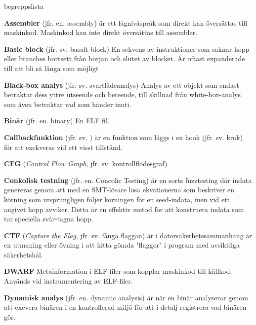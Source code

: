 \begin{labeling}{begreppslista}

    \item [\textbf{Assembler}] (jfr. en. assembly) är ett lågnivåspråk som
    direkt kan översättas till maskinkod. Maskinkod kan inte direkt översättas
    till assembler.

    \item[\textbf{Basic block}] (jfr. sv. basalt block) En sekvens av
    instruktioner som saknar hopp eller branches bortsett från början och slutet
    av blocket. Är oftast expanderade till att bli så långa som möjligt

    \item [\textbf{Black-box analys}] (jfr. sv. svartlådeanalys) Analys av ett
    objekt som endast betraktar dess yttre utseende och beteende, till skillnad
    från white-box-analys som även betraktar vad som händer inuti.

    \item [\textbf{Binär}] (jfr. en. binary) En ELF fil.

    \item [\textbf{Callbackfunktion}] (jfr. sv. ) är en funktion som läggs i en
    hook (jfr. sv. krok) för att exekveras vid ett visst tillstånd.

    \item [\textbf{CFG}] (\emph{Control Flow Graph}, jfr. sv.
          kontrollflödesgraf)

    \item [\textbf{Conkolisk testning}] (jfr. en. Concolic Testing) är en sorts
    fuzztesting där indata genereras genom att med en SMT-lösare lösa
    ekvationerna som beskriver en körning som ursprungligen följer körningen för
    en seed-indata, men vid ett angivet hopp avviker. Detta är en effektiv metod
    för att konstruera indata som tar 	speciella svår-tagna hopp.

    \item [\textbf{CTF}] (\emph{Capture the Flag}, jfr. sv. fånga flaggan) är i
    datorsäkerhetssammanhang är en utmaning eller övning i att hitta gömda
    "flaggor" i program med avsiktliga säkerhetshål.

    \item [\textbf{DWARF}] Metainformation i ELF-filer som kopplar maskinkod
    till källkod. Används vid instrumentering av ELF-filer.

    \item [\textbf{Dynamisk analys}] (jfr. en. dynamic analysis) är när en binär
    analyserar genom att exevera binären i en kontrollerad miljö för att i
    detalj registrera vad binären gör.


\end{labeling}
